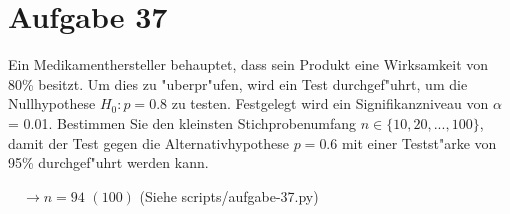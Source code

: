 \section{Aufgabe 37}

Ein Medikamenthersteller behauptet, dass sein Produkt eine Wirksamkeit von 80\%
besitzt. Um dies zu "uberpr"ufen, wird ein Test durchgef"uhrt, um die
Nullhypothese $H_0 : p = 0.8$ zu testen. Festgelegt wird ein Signifikanzniveau
von $\alpha$ = 0.01. Bestimmen Sie den kleinsten Stichprobenumfang $n \in \{10,
20, ..., 100\}$, damit der Test gegen die Alternativhypothese $p = 0.6$ mit
einer Testst"arke von 95\% durchgef"uhrt werden kann.

$\quad\rightarrow n = 94$ $(100)$ (Siehe scripts/aufgabe-37.py)
